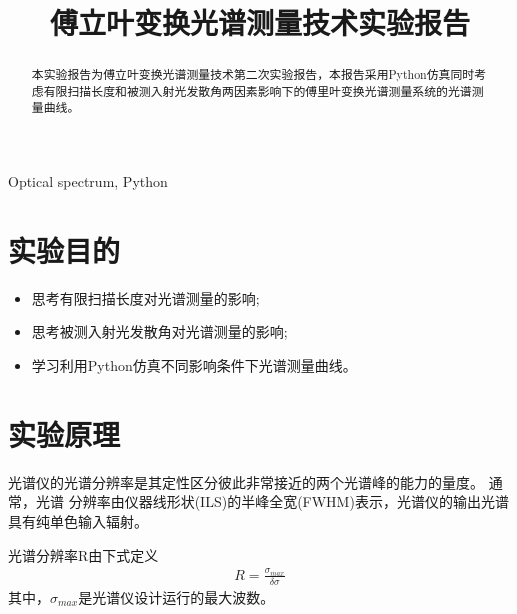 \documentclass[conference]{IEEEtran}
\begin{document}
\title{傅立叶变换光谱测量技术实验报告}

\author{
}

\maketitle

\begin{abstract}
本实验报告为傅立叶变换光谱测量技术第二次实验报告，本报告采用Python仿真同时考虑有限扫描长度和被测入射光发散角两因素影响下的傅里叶变换光谱测量系统的光谱测量曲线。
\end{abstract}

\begin{IEEEkeywords}
Optical spectrum, Python 
\end{IEEEkeywords}

\section{实验目的}
\begin{itemize}
\item 思考有限扫描长度对光谱测量的影响;
\item 思考被测入射光发散角对光谱测量的影响;
\item 学习利用Python仿真不同影响条件下光谱测量曲线。
\end{itemize}

\section{实验原理}
光谱仪的光谱分辨率是其定性区分彼此非常接近的两个光谱峰的能力的量度。 通常，光谱 分辨率由仪器线形状(ILS)的半峰全宽(FWHM)表示，光谱仪的输出光谱具有纯单色输入辐射。

光谱分辨率R由下式定义
\begin{align}
    R = \frac{\sigma_{max}}{\delta \sigma} \label{eq1}
\end{align} 
其中，$\sigma_{max}$是光谱仪设计运行的最大波数。
\end{document}
